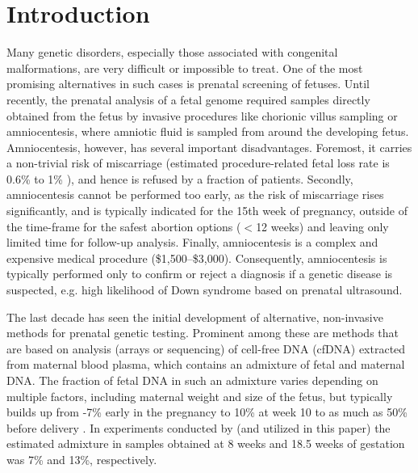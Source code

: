 \section{Introduction}

Many genetic disorders, especially those associated with congenital malformations, are very difficult or impossible to treat. One of the most promising alternatives in such cases is prenatal screening of fetuses. 
Until recently, the prenatal analysis of a fetal genome required samples directly obtained from the fetus by invasive procedures like chorionic villus sampling or amniocentesis, where amniotic fluid is sampled from around the developing fetus.
Amniocentesis, however, has several important disadvantages. Foremost, it carries a non-trivial risk of miscarriage (estimated procedure-related fetal loss rate is 0.6\% to 1\% \citep{douglas2007amnio}), and hence is refused by a fraction of patients. Secondly, amniocentesis cannot be performed too early, as the risk of miscarriage rises significantly, and is typically indicated for the 15th week of pregnancy, outside of the time-frame for the safest abortion options ($<$12 weeks) and leaving only limited time for follow-up analysis. Finally, amniocentesis is a complex and expensive medical procedure (\$1,500--\$3,000). Consequently, amniocentesis is typically performed only to confirm or reject a diagnosis if a genetic disease is suspected, e.g. high likelihood of Down syndrome based on prenatal ultrasound. 

The last decade has seen the initial development of alternative, non-invasive methods for prenatal genetic testing. Prominent among these are methods that are based on analysis (arrays or sequencing) of  cell-free DNA (cfDNA) extracted from maternal blood plasma, which contains an admixture of fetal and maternal DNA. The fraction of fetal DNA in such an admixture varies depending on multiple factors, including maternal weight and size of the fetus, but typically builds up from -7\% early in the pregnancy to 10\% at week 10 \citep{wang2013} to as much as 50\% before delivery \citep{wang2013, fan2012}. In experiments conducted by \cite{kitzman2012} (and utilized in this paper) the estimated admixture in samples obtained at 8 weeks and 18.5 weeks of gestation was 7\% and 13\%, respectively. 

